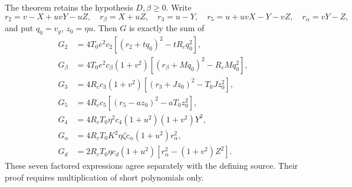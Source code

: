 The theorem retains the hypothesis $D,\beta\ge0$. Write
\[
r_2=v-X+uvY-uZ,\quad r_\beta=X+uZ,\quad r_3=u-Y,
\quad r_5=u+uvX-Y-vZ,\quad r_\alpha=vY-Z,
\]
and put $q_0=v_g$, $z_0=\eta u$. Then $G$ is exactly the sum of
\begin{align*}
G_2&=4T_0e^2c_2[(r_2+tq_0)^2-tR_cq_0^2],\\
G_\beta&=4T_0e^2c_\beta(1+v^2)[(r_\beta+Mq_0)^2-R_cMq_0^2],\\
G_3&=4R_cc_3(1+v^2)[(r_3+Jz_0)^2-T_0Jz_0^2],\\
G_5&=4R_cc_5[(r_5-az_0)^2-aT_0z_0^2],\\
G_4&=4R_cT_0\eta^2c_4(1+u^2)(1+v^2)Y^2,\\
G_\alpha&=4R_cT_0K^2\eta\zeta c_\alpha(1+u^2)r_\alpha^2,\\
G_d&=2R_cT_0\eta c_d(1+u^2)[r_\alpha^2-(1+v^2)Z^2].
\end{align*}
These seven factored expressions agree separately with the defining source. Their proof requires multiplication of short polynomials only.
